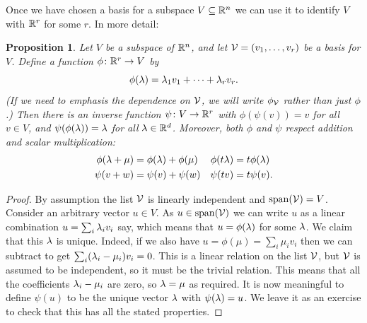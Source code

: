 \documentclass[reqno]{amsart}
\newtheorem{proposition}[theorem]{Proposition}
\theoremstyle{definition}
\begin{document}
Once we have chosen a basis for a subspace $V\subseteq{\mathbb{R}}^n$ we can use it
to identify $V$ with ${\mathbb{R}}^r$ for some $r$.  In more detail:

\begin{proposition}\label{prop-basis-iso}
 Let $V$ be a subspace of ${\mathbb{R}}^n$, and let $\mathcal{V}=(v_1,\dotsc,v_r)$ be a
 basis for $V$.  Define a function $\phi\colon{\mathbb{R}}^r\to V$ by
 \[ \phi(\lambda) = \lambda_1v_1 + \dotsb + \lambda_rv_r. \]
 (If we need to emphasis the dependence on $\mathcal{V}$, we will write
 $\phi_{\mathcal{V}}$ rather than just $\phi$.)  Then there is an inverse
 function $\psi\colon V\to{\mathbb{R}}^r$ with $\phi(\psi(v))=v$ for all $v\in V$,
 and $\psi(\phi(\lambda))=\lambda$ for all $\lambda\in{\mathbb{R}}^d$.  Moreover, both
 $\phi$ and $\psi$ respect addition and scalar multiplication:
 \begin{align*}
  \phi(\lambda+\mu) &= \phi(\lambda)+\phi(\mu) & \phi(t\lambda) &=t\phi(\lambda) \\
  \psi(v+w) &= \psi(v)+\psi(w) & \psi(tv) &= t\psi(v).
 \end{align*}
\end{proposition}
\begin{proof}
 By assumption the list $\mathcal{V}$ is linearly independent and
 $\operatorname{span}(\mathcal{V})=V$.   Consider an arbitrary vector $u\in V$.  As
 $u\in\operatorname{span}(\mathcal{V})$ we can write $u$ as a linear combination
 $u=\sum_i\lambda_iv_i$ say, which means that $u=\phi(\lambda)$ for some
 $\lambda$.  We claim that this $\lambda$ is unique.  Indeed, if we also have
 $u=\phi(\mu)=\sum_i\mu_iv_i$ then we can subtract to get
 $\sum_i(\lambda_i-\mu_i)v_i=0$.  This is a linear relation on the list
 $\mathcal{V}$, but $\mathcal{V}$ is assumed to be independent, so it must be the
 trivial relation.  This means that all the coefficients $\lambda_i-\mu_i$
 are zero, so $\lambda=\mu$ as required.  It is now meaningful to define
 $\psi(u)$ to be the unique vector $\lambda$ with $\psi(\lambda)=u$.  We leave
 it as an exercise to check that this has all the stated properties.
\end{proof}
\end{document}
